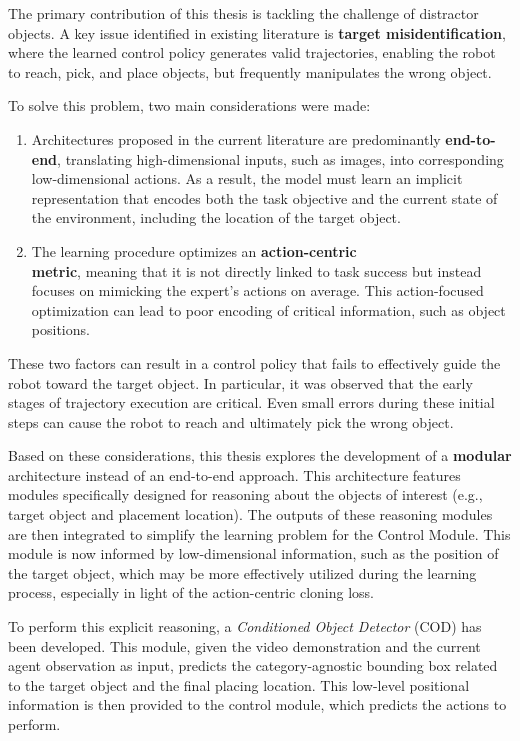 The primary contribution of this thesis is tackling the challenge of distractor objects. A key issue identified in existing literature is \textbf{target misidentification}, where the learned control policy generates valid trajectories, enabling the robot to reach, pick, and place objects, but frequently manipulates the wrong object.

To solve this problem, two main considerations were made:

\begin{enumerate}[label=\textbf{(\arabic*)}]
    \item Architectures proposed in the current literature are predominantly \textbf{end-to-end}, translating high-dimensional inputs, such as images, into corresponding low-dimensional actions. As a result, the model must learn an implicit representation that encodes both the task objective and the current state of the environment, including the location of the target object.
    \item The learning procedure optimizes an \textbf{action-centric \\ metric}, meaning that it is not directly linked to task success but instead focuses on mimicking the expert's actions on average. This action-focused optimization can lead to poor encoding of critical information, such as object positions.
\end{enumerate}

These two factors can result in a control policy that fails to effectively guide the robot toward the target object. In particular, it was observed that the early stages of trajectory execution are critical. Even small errors during these initial steps can cause the robot to reach and ultimately pick the wrong object.

Based on these considerations, this thesis explores the development of a \textbf{modular} architecture instead of an end-to-end approach. This architecture features modules specifically designed for reasoning about the objects of interest (e.g., target object and placement location). The outputs of these reasoning modules are then integrated to simplify the learning problem for the Control Module. This module is now informed by low-dimensional information, such as the position of the target object, which may be more effectively utilized during the learning process, especially in light of the action-centric cloning loss.

To perform this explicit reasoning, a \textit{Conditioned Object Detector} (COD) has been developed. This module, given the video demonstration and the current agent observation as input, predicts the category-agnostic bounding box related to the target object and the final placing location. This low-level positional information is then provided to the control module, which predicts the actions to perform.


